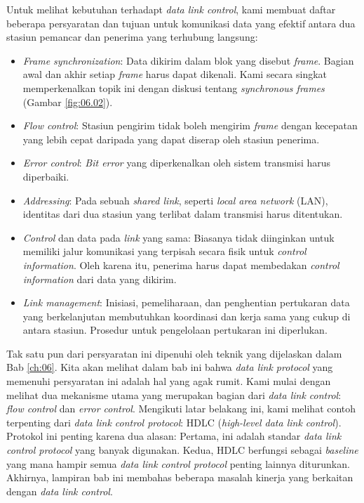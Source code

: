 Untuk melihat kebutuhan terhadapt \textit{data link control}, kami membuat daftar beberapa persyaratan dan tujuan untuk komunikasi data yang efektif antara dua stasiun pemancar dan penerima yang terhubung langsung:

\begin{itemize}
	
	\item \textit{Frame synchronization}: Data dikirim dalam blok yang disebut \textit{frame}. Bagian awal dan akhir setiap \textit{frame} harus dapat dikenali. Kami secara singkat memperkenalkan topik ini dengan diskusi tentang \textit{synchronous frames} (Gambar \ref{fig:06.02}).

	\item \textit{Flow control}: Stasiun pengirim tidak boleh mengirim \textit{frame} dengan kecepatan yang lebih cepat daripada yang dapat diserap oleh stasiun penerima.
	
	\item \textit{Error control}: \textit{Bit error} yang diperkenalkan oleh sistem transmisi harus diperbaiki.
	
	\item \textit{Addressing}: Pada sebuah \textit{shared link}, seperti \textit{local area network} (LAN), identitas dari dua stasiun yang terlibat dalam transmisi harus ditentukan.
	
	\item \textit{Control} dan data pada \textit{link} yang sama: Biasanya tidak diinginkan untuk memiliki jalur komunikasi yang terpisah secara fisik untuk \textit{control information}. Oleh karena itu, penerima harus dapat membedakan \textit{control information} dari data yang dikirim.
	
	\item \textit{Link management}: Inisiasi, pemeliharaan, dan penghentian pertukaran data yang berkelanjutan membutuhkan koordinasi dan kerja sama yang cukup di antara stasiun. Prosedur untuk pengelolaan pertukaran ini diperlukan.
\end{itemize}

Tak satu pun dari persyaratan ini dipenuhi oleh teknik yang dijelaskan dalam Bab \ref{ch:06}. Kita akan melihat dalam bab ini bahwa \textit{data link protocol} yang memenuhi persyaratan ini adalah hal yang agak rumit. Kami mulai dengan melihat dua mekanisme utama yang merupakan bagian dari \textit{data link control}: \textit{flow control} dan \textit{error control}. Mengikuti latar belakang ini, kami melihat contoh terpenting dari \textit{data link control protocol}: HDLC (\textit{high-level data link control}). Protokol ini penting karena dua alasan: Pertama, ini adalah standar \textit{data link control protocol} yang banyak digunakan. Kedua, HDLC berfungsi sebagai \textit{baseline} yang mana hampir semua \textit{data link control protocol} penting lainnya diturunkan. Akhirnya, lampiran bab ini membahas beberapa masalah kinerja yang berkaitan dengan \textit{data link control}.


